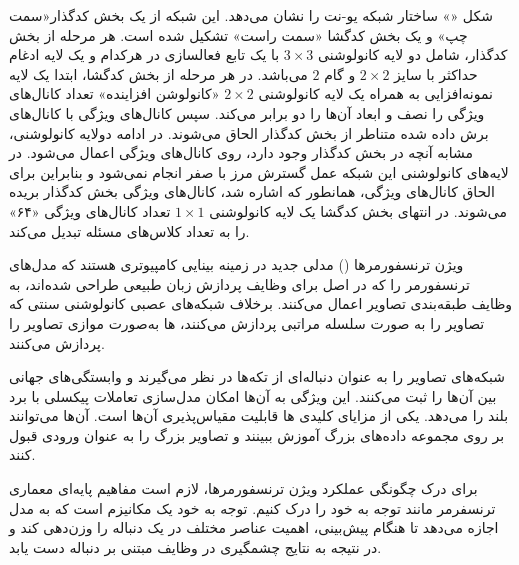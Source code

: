 شکل «» ساختار شبکه یو-نت را نشان می‌دهد. این شبکه از یک بخش کدگذار«سمت چپ» و یک بخش کدگشا «سمت راست» تشکیل شده است. هر مرحله از بخش کدگذار، شامل دو لایه کانولوشنی \(3 \times 3\) با یک تابع فعالسازی  در هرکدام و یک لایه ادغام حداکثر با سایز \(2 \times 2\) و گام \(2\) می‌باشد. در هر مرحله از بخش کدگشا، ابتدا یک لایه نمونه‌افزایی به همراه یک لایه کانولوشنی \(2 \times 2\) «کانولوشن افزاینده» تعداد کانال‌های ویژگی را نصف و ابعاد آن‌ها را دو برابر می‌کند. سپس کانال‌های ویژگی با کانال‌های برش داده شده متناطر از بخش کدگذار الحاق می‌شوند. در ادامه دولایه کانولوشنی، مشابه آنچه در بخش کدگذار وجود دارد، روی کانال‌های ویژگی اعمال می‌شود. در لایه‌های کانولوشنی این شبکه عمل گسترش مرز با صفر انجام نمی‌شود و بنابراین برای الحاق کانال‌های ویژگی، همانطور که اشاره شد، کانال‌های ویژگی بخش کدگذار بریده می‌شوند. در انتهای بخش کدگشا یک لایه کانولوشنی \(1 \times 1\) تعداد کانال‌های ویژگی «۶۴» را به تعداد کلاس‌های مسئله تبدیل می‌کند.






ویژن ترنسفورمرها () مدلی جدید در زمینه بینایی کامپیوتری هستند که مدل‌های ترنسفورمر را که در اصل برای وظایف پردازش زبان طبیعی طراحی شده‌اند، به وظایف طبقه‌بندی تصاویر اعمال می‌کنند. برخلاف شبکه‌های عصبی کانولوشنی سنتی که تصاویر را به صورت سلسله مراتبی پردازش می‌کنند،  ها به‌صورت موازی تصاویر را پردازش می‌کنند.


شبکه‌های  تصاویر را به عنوان دنباله‌ای از تکه‌ها در نظر می‌گیرند و وابستگی‌های جهانی بین آن‌ها را ثبت می‌کنند. این ویژگی به آن‌ها امکان مدل‌سازی تعاملات پیکسلی با برد بلند را می‌دهد. یکی از مزایای کلیدی  ها قابلیت مقیاس‌پذیری آن‌ها است. آن‌ها می‌توانند بر روی مجموعه داده‌های بزرگ آموزش ببینند و تصاویر بزرگ را به عنوان ورودی قبول کنند.




برای درک چگونگی عملکرد ویژن ترنسفورمرها، لازم است مفاهیم پایه‌ای معماری ترنسفرمر مانند توجه به خود را درک کنیم. توجه به خود یک مکانیزم است که به مدل اجازه می‌دهد تا هنگام پیش‌بینی، اهمیت عناصر مختلف در یک دنباله را وزن‌دهی کند و در نتیجه به نتایج چشمگیری در وظایف مبتنی بر دنباله دست یابد.
































